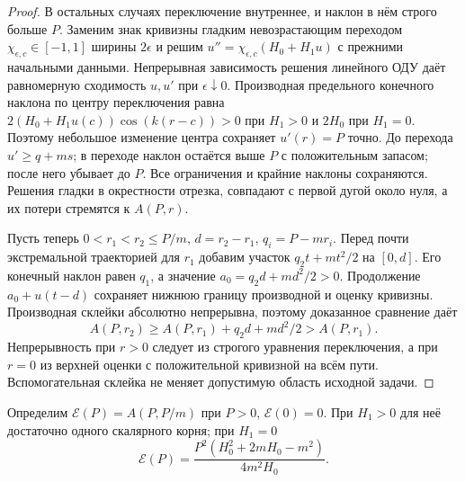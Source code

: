 \begin{proof}
В остальных случаях переключение внутреннее, и наклон в нём
строго больше $P$. Заменим знак кривизны гладким невозрастающим
переходом $\chi_{\epsilon,c}\in[-1,1]$ ширины $2\epsilon$ и решим
$u''=\chi_{\epsilon,c}(H_0+H_1u)$ с прежними начальными данными.
Непрерывная зависимость решения линейного ОДУ даёт равномерную
сходимость $u,u'$ при $\epsilon\downarrow0$.
Производная предельного конечного наклона по центру переключения
равна $2(H_0+H_1u(c))\cos(k(r-c))>0$ при $H_1>0$
и $2H_0$ при $H_1=0$. Поэтому небольшое изменение центра
сохраняет $u'(r)=P$ точно.
До перехода $u'\ge q+ms$; в переходе наклон остаётся выше $P$
с положительным запасом; после него убывает до $P$.
Все ограничения и крайние наклоны сохраняются.
Решения гладки в окрестности отрезка, совпадают с первой дугой
около нуля, а их потери стремятся к $A(P,r)$.

Пусть теперь $0<r_1<r_2\le P/m$, $d=r_2-r_1$, $q_i=P-mr_i$.
Перед почти экстремальной траекторией для $r_1$ добавим участок
$q_2t+mt^2/2$ на $[0,d]$. Его конечный наклон равен $q_1$,
а значение $a_0=q_2d+md^2/2>0$.
Продолжение $a_0+u(t-d)$ сохраняет нижнюю границу производной
и оценку кривизны. Производная склейки абсолютно непрерывна,
поэтому доказанное сравнение даёт
\begin{equation}\label{compact:radial-growth}
 A(P,r_2)\ge A(P,r_1)+q_2d+md^2/2>A(P,r_1).
\end{equation}
Непрерывность при $r>0$ следует из строгого уравнения
переключения, а при $r=0$ из верхней оценки с положительной
кривизной на всём пути. Вспомогательная склейка не меняет
допустимую область исходной задачи.
\end{proof}

Определим $\mathcal E(P)=A(P,P/m)$ при $P>0$, $\mathcal E(0)=0$.
При $H_1>0$ для неё достаточно одного скалярного корня; при $H_1=0$
\begin{equation}\label{energy:constant}
 \mathcal E(P)=\frac{P^2(H_0^2+2mH_0-m^2)}{4m^2H_0}.
\end{equation}

